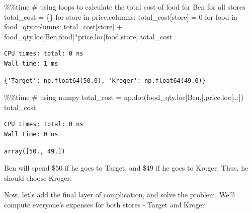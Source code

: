 \documentclass[
  letterpaper,
  DIV=11,
  numbers=noendperiod]{scrreprt}
\newenvironment{Shaded}{\begin{snugshade}}{\end{snugshade}}
\newcommand{\CommentTok}[1]{\textcolor[rgb]{0.37,0.37,0.37}{#1}}
\newcommand{\ControlFlowTok}[1]{\textcolor[rgb]{0.00,0.23,0.31}{#1}}
\newcommand{\DecValTok}[1]{\textcolor[rgb]{0.68,0.00,0.00}{#1}}
\newcommand{\KeywordTok}[1]{\textcolor[rgb]{0.00,0.23,0.31}{#1}}
\newcommand{\NormalTok}[1]{\textcolor[rgb]{0.00,0.23,0.31}{#1}}
\newcommand{\OperatorTok}[1]{\textcolor[rgb]{0.37,0.37,0.37}{#1}}
\newcommand{\StringTok}[1]{\textcolor[rgb]{0.13,0.47,0.30}{#1}}
\begin{document}
\begin{Shaded}
\begin{Highlighting}[]
\OperatorTok{\%\%}\NormalTok{time}
\CommentTok{\# using loops to calculate the total cost of food for Ben for all stores}
\NormalTok{total\_cost }\OperatorTok{=}\NormalTok{ \{\}}
\ControlFlowTok{for}\NormalTok{ store }\KeywordTok{in}\NormalTok{ price.columns:}
\NormalTok{    total\_cost[store] }\OperatorTok{=} \DecValTok{0}
    \ControlFlowTok{for}\NormalTok{ food }\KeywordTok{in}\NormalTok{ food\_qty.columns:}
\NormalTok{        total\_cost[store] }\OperatorTok{+=}\NormalTok{ food\_qty.loc[}\StringTok{\textquotesingle{}Ben\textquotesingle{}}\NormalTok{,food]}\OperatorTok{*}\NormalTok{price.loc[food,store]}
\NormalTok{total\_cost}
\end{Highlighting}
\end{Shaded}

\begin{verbatim}
CPU times: total: 0 ns
Wall time: 1 ms
\end{verbatim}

\begin{verbatim}
{'Target': np.float64(50.0), 'Kroger': np.float64(49.0)}
\end{verbatim}

\begin{Shaded}
\begin{Highlighting}[]
\OperatorTok{\%\%}\NormalTok{time}
\CommentTok{\# using numpy}
\NormalTok{total\_cost }\OperatorTok{=}\NormalTok{ np.dot(food\_qty.loc[}\StringTok{\textquotesingle{}Ben\textquotesingle{}}\NormalTok{,],price.loc[:,:])}
\NormalTok{total\_cost}
\end{Highlighting}
\end{Shaded}

\begin{verbatim}
CPU times: total: 0 ns
Wall time: 0 ns
\end{verbatim}

\begin{verbatim}
array([50., 49.])
\end{verbatim}

Ben will spend \$50 if he goes to Target, and \$49 if he goes to Kroger.
Thus, he should choose Kroger.

Now, let's add the final layer of complication, and solve the problem.
We'll compute everyone's expenses for both stores - Target and Kroger
\end{document}
